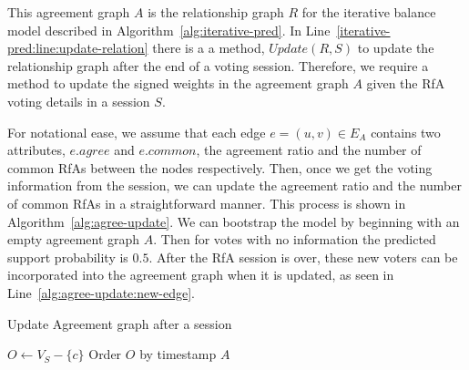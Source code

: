 This agreement graph $A$ is the relationship graph $R$ for the iterative balance model described in Algorithm~\ref{alg:iterative-pred}. 
In Line~\ref{iterative-pred:line:update-relation} there is a a method, $Update(R,S)$ to update the relationship graph after the end of a voting session.
Therefore, we require a method to update the signed weights in the agreement graph $A$ given the RfA voting details in a session $S$.

For notational ease, we assume that each edge $e = (u,v) \in E_{A}$ contains two attributes, $e.agree$ and $e.common$, the agreement ratio and the number of common RfAs between the nodes respectively.
Then, once we get the voting information from the session, we can update the agreement ratio and the number of common RfAs in a straightforward manner.
This process is shown in Algorithm~\ref{alg:agree-update}.
We can bootstrap the model by beginning with an empty agreement graph $A$.
Then for votes with no information the predicted support probability is $0.5$.
After the RfA session is over, these new voters can be incorporated into the agreement graph when it is updated, as seen in Line~\ref{alg:agree-update:new-edge}.

\begin{algorithm}[htp]
    \DontPrintSemicolon
    \caption{Update Agreement graph after a session}
    \label{alg:agree-update}
    $O \leftarrow V_{S}-\{c\}$\;
    Order $O$ by timestamp\;
    \Return $A$
\end{algorithm}


